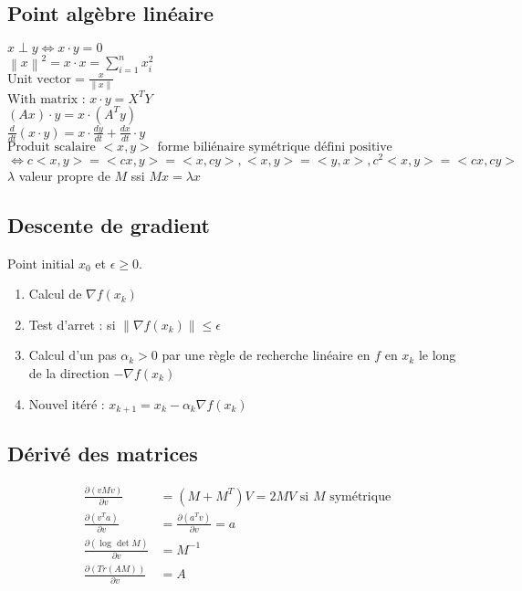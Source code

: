 \documentclass{article}
\begin{document}
\subsection{Point algèbre linéaire}
$\displaystyle x \perp y \Leftrightarrow x \cdot y = 0 $ \\
$\displaystyle \left\| x \right\| ^2 = x \cdot x = \sum_{i=1}^{n}x_i^2 $ \\ 
$\displaystyle \text{Unit vector} = \frac{x}{\left\| x \right\| } $ \\
$\displaystyle \text{With matrix : } x \cdot y = X^T Y $ \\
$\displaystyle (Ax) \cdot y = x \cdot (A^T y) $ \\
$\displaystyle \frac{d}{dt}(x \cdot y) = x \cdot \frac{dy}{dt} + \frac{dx}{dt}\cdot y $ \\
$\displaystyle \text{Produit scalaire } <x,y> \text{ forme biliénaire symétrique défini positive} $ \\
$\displaystyle \Leftrightarrow c <x, y> = <cx, y> = <x,cy>, <x,y> = <y,x>, c^2 < x,y> = <cx, cy> $ \\
$\displaystyle \lambda  $ valeur propre  de $ M $ ssi $ Mx = \lambda x $ 

\subsection{Descente de gradient}
Point initial $ x_0 $ et $ \epsilon \geq 0 $.
\begin{enumerate}
    \item Calcul de $ \nabla f(x_k) $ 
    \item Test d'arret : si $ \left\| \nabla f(x_k) \right\| \leq \epsilon  $ 
    \item Calcul d'un pas $ \alpha _k > 0 $ par une règle de recherche linéaire en $ f $ en $ x_k $ le long de la direction $ - \nabla f(x_k) $ 
    \item Nouvel itéré : $ x_{k+1} = x_k - \alpha _k \nabla f(x_k) $ 
\end{enumerate}

\subsection{Dérivé des matrices}
\begin{align*}
    \frac{\partial (vMv)}{\partial v} &= (M + M^T)V = 2MV \text{ si } M \text{ symétrique} \\
    \frac{\partial (v^T a)}{\partial v} &= \frac{\partial (a^T v)}{\partial v} = a \\
    \frac{\partial (\log_{} \det M)}{\partial v} &= M^{-1}\\
    \frac{\partial (Tr(AM))}{\partial v} &= A
\end{align*}
\end{document}
